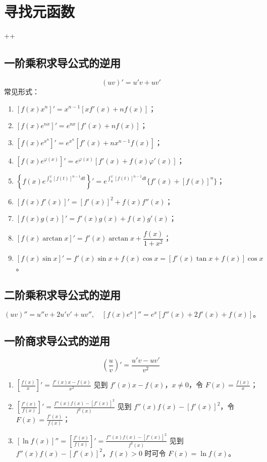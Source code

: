 
\section{寻找元函数}
\POneTwo+\POneThree+\DTwoThree

\subsection{一阶乘积求导公式的逆用}
\[
    (uv)' = u'v + uv'
\]
常见形式：
\begin{enumerate}
    \item $[f(x) x^n]' = x^{n-1}[x f'(x) + n f(x)]$；
    \item $[f(x) e^{nx}]' = e^{nx}[f'(x) + n f(x)]$；
    \item $[f(x) e^{x^n}]' = e^{x^n}[f'(x) + n x^{n-1} f(x)]$；
    \item $[f(x) e^{\varphi(x)}]' = e^{\varphi(x)}[f'(x) + f(x)\varphi'(x)]$；
    \item $\displaystyle \left\{ f(x)e^{\int_0^x [f(t)]^{n-1}dt} \right\}' = e^{\int_0^x [f(t)]^{n-1}dt}\{f'(x) + [f(x)]^n\}$；
    \item $[f(x)f'(x)]' = [f'(x)]^2 + f(x)f''(x)$；
    \item $[f(x)g(x)]' = f'(x)g(x) + f(x)g'(x)$；
    \item $[f(x)\arctan x]' = f'(x)\arctan x + \dfrac{f(x)}{1+x^2}$；
    \item $[f(x)\sin x]' = f'(x)\sin x + f(x)\cos x = [f'(x)\tan x + f(x)]\cos x$。
\end{enumerate}

\subsection{二阶乘积求导公式的逆用}
\[
    (uv)'' = u''v + 2u'v' + uv'', \quad [f(x)e^x]'' = e^x[f''(x) + 2f'(x) + f(x)]。
\]

\subsection{一阶商求导公式的逆用}
\[
    \left(\frac{u}{v}\right)' = \frac{u'v - uv'}{v^2}
\]
\begin{enumerate}
    \item $\displaystyle \left[\frac{f(x)}{x}\right]' = \frac{f'(x)x - f(x)}{x^2}$
          见到 $f'(x)x - f(x)$，$x \ne 0$，令 $F(x)=\frac{f(x)}{x}$；
    \item $\displaystyle \left[\frac{f'(x)}{f(x)}\right]' = \frac{f''(x)f(x) - [f'(x)]^2}{f^2(x)}$
          见到 $f''(x)f(x) - [f'(x)]^2$，令 $F(x)=\frac{f'(x)}{f(x)}$；
    \item $[\ln f(x)]'' = \left[\frac{f'(x)}{f(x)}\right]' = \frac{f''(x)f(x) - [f'(x)]^2}{f^2(x)}$
          见到 $f''(x)f(x) - [f'(x)]^2$，$f(x)>0$ 时可令 $F(x)=\ln f(x)$。
\end{enumerate}


